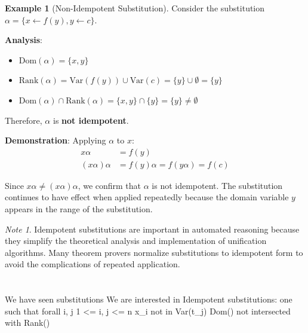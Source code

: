 \documentclass[11pt,a4paper]{article}
\theoremstyle{definition}
\newtheorem{example}{Example}[section]
\theoremstyle{plain}
\theoremstyle{remark}
\newtheorem*{remark}{Note}
\begin{document}
\begin{example}[Non-Idempotent Substitution]
Consider the substitution $\alpha = \{x \leftarrow f(y), y \leftarrow c\}$.

\textbf{Analysis}:
\begin{itemize}
    \item $\text{Dom}(\alpha) = \{x, y\}$
    \item $\text{Rank}(\alpha) = \text{Var}(f(y)) \cup \text{Var}(c) = \{y\} \cup \emptyset = \{y\}$
    \item $\text{Dom}(\alpha) \cap \text{Rank}(\alpha) = \{x, y\} \cap \{y\} = \{y\} \neq \emptyset$
\end{itemize}

Therefore, $\alpha$ is \textbf{not idempotent}.

\textbf{Demonstration}: Applying $\alpha$ to $x$:
\begin{align*}
x\alpha &= f(y) \\
(x\alpha)\alpha &= f(y)\alpha = f(y\alpha) = f(c)
\end{align*}

Since $x\alpha \neq (x\alpha)\alpha$, we confirm that $\alpha$ is not idempotent. The substitution continues to have effect when applied repeatedly because the domain variable $y$ appears in the range of the substitution.
\end{example}

\begin{remark}
Idempotent substitutions are important in automated reasoning because they simplify the theoretical analysis and implementation of unification algorithms. Many theorem provers normalize substitutions to idempotent form to avoid the complications of repeated application.
\end{remark}



\newpage

\part{}

\section{}

We have seen substitutions \sigma 
We are interested in Idempotent substitutions: one such that
forall i, j 1 <= i, j <= n    x_i not in Var(t_j)     Dom(\sigma) not intersected with Rank(\alpha)
\end{document}
